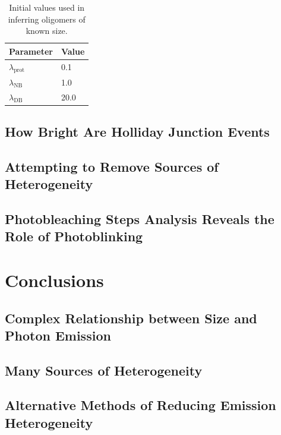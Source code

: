 \begin{center}
\begin{table}[!ht]
\begin{tabular}{|l|l|}
\hline
{\bf Parameter} & {\bf Value}\\ \hline
$\lambda_{\text{prot}}$ & 0.1\\
$\lambda_{\text{NB}}$ & 1.0\\
$\lambda_{\text{DB}}$ & 20.0\\
\hline
\end{tabular}
\caption{Initial values used in inferring  oligomers of known size.}
\label{tab:oligomer_params}
\end{table}
\end{center}



\subsection{How Bright Are Holliday Junction Events}
\subsection{Attempting to Remove Sources of Heterogeneity}
\subsection{Photobleaching Steps Analysis Reveals the Role of Photoblinking}

\section{Conclusions}
\subsection{Complex Relationship between Size and Photon Emission}
\subsection{Many Sources of Heterogeneity}
\subsection{Alternative Methods of Reducing Emission Heterogeneity}